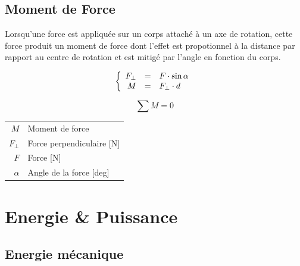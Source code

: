 \documentclass[12pt,a4paper]{article} %
\begin{document}
\subsection{Moment de Force}
Lorsqu'une force est appliquée sur un corps attaché à un axe de rotation, cette force produit un moment de force dont l'effet est propotionnel à la distance par rapport au centre de rotation et est mitigé par l'angle en fonction du corps.
\par\hspace{1em}
\begin{mdframed}[leftmargin=2em, rightmargin=2em]
	\begin{twocols}[0.5][0.5]
	$$
		\left\{
			\begin{array}{rcl}
			F_\perp & = & F \cdot \sin \alpha \\
			M & = & F_\perp \cdot d \\
			\end{array}
		\right.
	$$

	$$
		\sum M = 0
	$$
	\nextcol
	\begin{tabular}{rl}
		$M$ & Moment de force \\
		$F_\perp$ & Force perpendiculaire [N] \\
		$F$ & Force [N] \\
		$\alpha$ & Angle de la force [deg] \\
	\end{tabular}
	\end{twocols}
\end{mdframed}

\newpage

\section{Energie \& Puissance}

\subsection{Energie mécanique}
\end{document}
